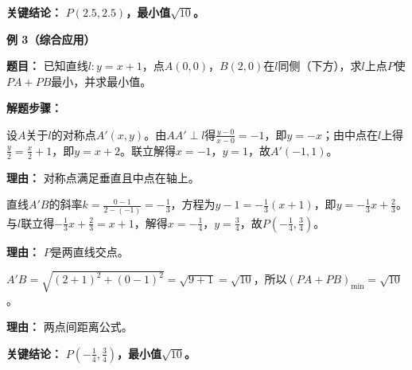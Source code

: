 \begin{examplebox}
	\textbf{\textcolor{CExample}{关键结论：}}
	\textbf{$P(2.5,2.5)$，最小值$\sqrt{10}$。}

	\medskip
	\textbf{\textcolor{CExample}{例 3（综合应用）}}

	\textbf{\textcolor{CExample}{题目：}}
	已知直线$l:y=x+1$，点$A(0,0)$，$B(2,0)$在$l$同侧（下方），求$l$上点$P$使$PA+PB$最小，并求最小值。

	\textbf{\textcolor{CExample}{解题步骤：}}
	\begin{description}[style=nextline, leftmargin=2.8em, labelsep=0.5em, itemsep=0.45em]
		\item[\textbf{第一步（求对称点）：}] 设$A$关于$l$的对称点$A'(x,y)$。由$AA'\perp l$得$\frac{y-0}{x-0}=-1$，即$y=-x$；由中点在$l$上得$\frac{y}{2}=\frac{x}{2}+1$，即$y=x+2$。联立解得$x=-1$，$y=1$，故$A'(-1,1)$。
			\par\textbf{理由：} 对称点满足垂直且中点在轴上。
		\item[\textbf{第二步（连线求交）：}] 直线$A'B$的斜率$k=\frac{0-1}{2-(-1)}=-\frac{1}{3}$，方程为$y-1=-\frac{1}{3}(x+1)$，即$y=-\frac{1}{3}x+\frac{2}{3}$。与$l$联立得$-\frac{1}{3}x+\frac{2}{3}=x+1$，解得$x=-\frac{1}{4}$，$y=\frac{3}{4}$，故$P\left(-\frac{1}{4},\frac{3}{4}\right)$。
			\par\textbf{理由：} $P$是两直线交点。
		\item[\textbf{第三步（计算最值）：}] $A'B=\sqrt{(2+1)^2+(0-1)^2}=\sqrt{9+1}=\sqrt{10}$，所以$(PA+PB)_{\min}=\sqrt{10}$。
			\par\textbf{理由：} 两点间距离公式。
	\end{description}

	\textbf{\textcolor{CExample}{关键结论：}}
	\textbf{$P\left(-\frac{1}{4},\frac{3}{4}\right)$，最小值$\sqrt{10}$。}
\end{examplebox}
